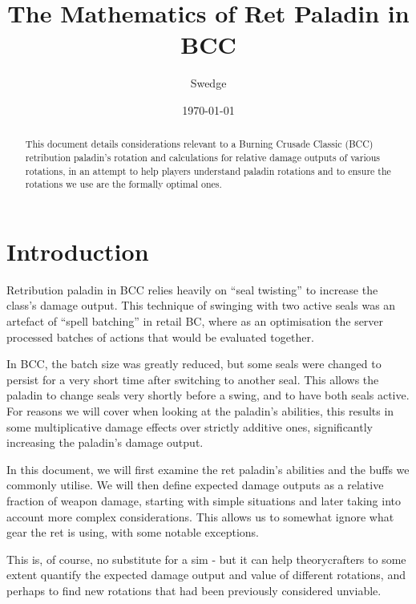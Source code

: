 \documentclass[letterpaper,11pt]{article}
\begin{document}
	
	\title{The Mathematics of Ret Paladin in BCC}
	\author{Swedge}
	\date{\today}
	\maketitle
	
	\begin{abstract}
		This document details considerations relevant to a Burning Crusade Classic (BCC) retribution paladin's rotation and calculations for relative damage outputs of various rotations, in an attempt to help players understand paladin rotations and to ensure the rotations we use are the formally optimal ones.
	\end{abstract}
	
	\section{Introduction}
	
	Retribution paladin in BCC relies heavily on ``seal twisting'' to increase the class's damage output.
	This technique of swinging with two active seals was an artefact of ``spell batching'' in retail BC, where as an optimisation the server processed batches of actions that would be evaluated together.
	
	In BCC, the batch size was greatly reduced, but some seals were changed to persist for a very short time after switching to another seal.
	This allows the paladin to change seals very shortly before a swing, and to have both seals active. For reasons we will cover when looking at the paladin's abilities, this results in some multiplicative damage effects over strictly additive ones, significantly increasing the paladin's damage output.
	
	In this document, we will first examine the ret paladin's abilities and the buffs we commonly utilise.
	We will then define expected damage outputs as a relative fraction of weapon damage, starting with simple situations and later taking into account more complex considerations.
	This allows us to somewhat ignore what gear the ret is using, with some notable exceptions.
	
	This is, of course, no substitute for a sim - but it can help theorycrafters to some extent quantify the expected damage output and value of different rotations, and perhaps to find new rotations that had been previously considered unviable.
	
\end{document}
